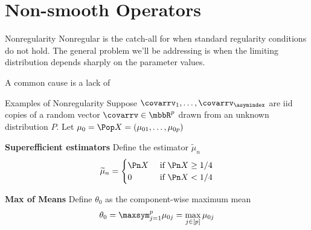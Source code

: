 \documentclass[aspectratio=169, professionalfonts, handout]{beamer}
\begin{document}




\section{Non-smooth Operators}
\begin{frame}{Nonregularity}
	Nonregular is the catch-all for when standard regularity conditions do
	not hold.
	\vfill \pause
	The general problem we'll be addressing is when the limiting
	distribution depends sharply on the parameter values.

	\vfill
	A common cause is a lack of

	\vfill
\end{frame}

\begin{frame}{Examples of Nonregularity}
	Suppose $\covarrv_1, \ldots, \covarrv_{\asymindex}$ are iid copies of a random vector
	$\covarrv \in \mbbR^{p}$ drawn from an unknown distribution $P$. Let $\mu_0 = \Pop X
		= (\mu_{01}, \ldots, \mu_{0p})$

	\vfill \pause

	\textbf{Superefficient estimators}
	Define the estimator $\widetilde{\mu}_n$
	\begin{displaymath}
		\widetilde{\mu}_n = \begin{cases} \Pn X & \text { if } \Pn X \geq 1/4 \\
              0     & \text { if } \Pn X < 1/4\end{cases}
	\end{displaymath}

	\vfill \pause

	\textbf{Max of Means}
	Define $\theta_0$ as the component-wise maximum mean
	\begin{displaymath}
		\theta_0 = \maxsym_{j = 1}^p \mu_{0j} = \max_{j \in [p]} \mu_{0j}
	\end{displaymath}
\end{frame}
\end{document}
